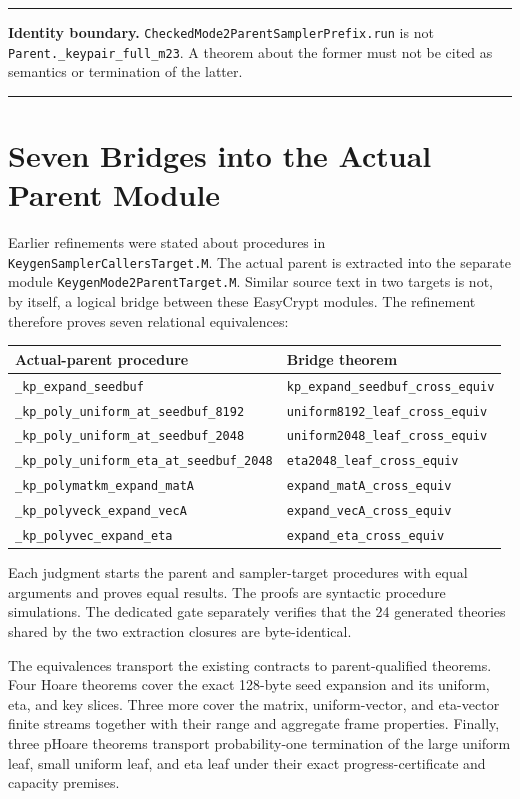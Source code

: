 \documentclass[11pt]{article}
\theoremstyle{definition}
\theoremstyle{plain}
\theoremstyle{remark}
\newcommand{\code}[1]{\nolinkurl{#1}}
\newenvironment{boundarybox}
  {\begin{center}\begin{minipage}{0.94\linewidth}\color{artifactred}\hrule\vspace{0.6em}\color{black}}
  {\vspace{0.6em}\color{artifactred}\hrule\end{minipage}\end{center}}
\begin{document}
\begin{boundarybox}
\textbf{Identity boundary.}
\code{CheckedMode2ParentSamplerPrefix.run} is not
\code{Parent._keypair_full_m23}.  A theorem about the former must not be cited
as semantics or termination of the latter.
\end{boundarybox}

\section{Seven Bridges into the Actual Parent Module}

Earlier refinements were stated about procedures in
\code{KeygenSamplerCallersTarget.M}.  The actual parent is extracted into the
separate module \code{KeygenMode2ParentTarget.M}.  Similar source text in two
targets is not, by itself, a logical bridge between these EasyCrypt modules.
The refinement therefore proves seven relational equivalences:

\begin{center}
\begin{tabularx}{\textwidth}{>{\raggedright\arraybackslash}p{}X}
\toprule
Actual-parent procedure & Bridge theorem\\
\midrule
\code{_kp_expand_seedbuf} &
\code{kp_expand_seedbuf_cross_equiv}\\
\code{_kp_poly_uniform_at_seedbuf_8192} &
\code{uniform8192_leaf_cross_equiv}\\
\code{_kp_poly_uniform_at_seedbuf_2048} &
\code{uniform2048_leaf_cross_equiv}\\
\code{_kp_poly_uniform_eta_at_seedbuf_2048} &
\code{eta2048_leaf_cross_equiv}\\
\code{_kp_polymatkm_expand_matA} &
\code{expand_matA_cross_equiv}\\
\code{_kp_polyveck_expand_vecA} &
\code{expand_vecA_cross_equiv}\\
\code{_kp_polyvec_expand_eta} &
\code{expand_eta_cross_equiv}\\
\bottomrule
\end{tabularx}
\end{center}

Each judgment starts the parent and sampler-target procedures with equal
arguments and proves equal results.  The proofs are syntactic procedure
simulations.  The dedicated gate separately verifies that the 24 generated
theories shared by the two extraction closures are byte-identical.

The equivalences transport the existing contracts to parent-qualified
theorems.  Four Hoare theorems cover the exact 128-byte seed expansion and its
uniform, eta, and key slices.  Three more cover the matrix, uniform-vector,
and eta-vector finite streams together with their range and aggregate frame
properties.  Finally, three pHoare theorems transport probability-one
termination of the large uniform leaf, small uniform leaf, and eta leaf under
their exact progress-certificate and capacity premises.
\end{document}
